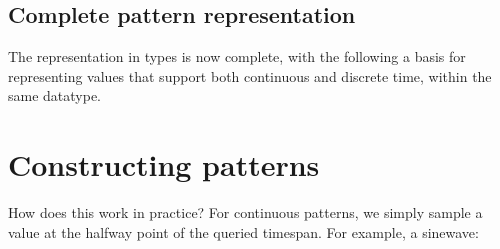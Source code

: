 \subsection{Complete pattern
representation}\label{complete-pattern-representation}

The representation in types is now complete, with the following a basis
for representing values that support both continuous and discrete time,
within the same datatype.

\begin{Shaded}
\begin{Highlighting}[]
  \OtherTok{=} 
  \OtherTok{=} \NormalTok{ \{} \NormalTok{,} \NormalTok{\}}
     
 \OtherTok{=} \NormalTok{ \{}  \NormalTok{,} \NormalTok{,}
    \NormalTok{ (}\NormalTok{, }\NormalTok{)}
 \OtherTok{=} \NormalTok{ \{}  \OtherTok{{-}\textgreater{}}\NormalTok{ [}\NormalTok{ a]\}}
    \NormalTok{ (}\NormalTok{)}
\end{Highlighting}
\end{Shaded}

\section{Constructing patterns}\label{constructing-patterns}

How does this work in practice? For continuous patterns, we simply
sample a value at the halfway point of the queried timespan. For
example, a sinewave:

\begin{Shaded}
\begin{Highlighting}[]
  
\OtherTok{=}  \OperatorTok{$}\OtherTok{{-}\textgreater{}}
\NormalTok{  [} \OperatorTok{$}  \OperatorTok{$}\NormalTok{ (} \OperatorTok{$}\OperatorTok{*}  \OperatorTok{*} \NormalTok{]}
    \OtherTok{=}\OperatorTok{+}\OperatorTok{{-}}\OperatorTok{/} \NormalTok{)}
\end{Highlighting}
\end{Shaded}

